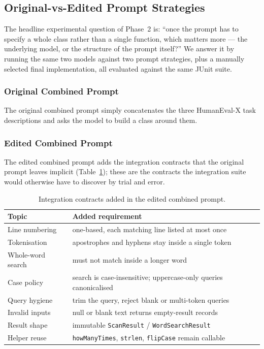 \documentclass[journal]{IEEEtran}
\begin{document}
\subsection{Original-vs-Edited Prompt Strategies}

The headline experimental question of Phase~2 is: ``once the prompt has
to specify a whole class rather than a single function, which matters
more --- the underlying model, or the structure of the prompt itself?'' We
answer it by running the same two models against two prompt strategies,
plus a manually selected final implementation, all evaluated against the
same JUnit suite.

\subsubsection{Original Combined Prompt}
The original combined prompt simply concatenates the three HumanEval-X
task descriptions and asks the model to build a class around them.

\subsubsection{Edited Combined Prompt}
The edited combined prompt adds the integration contracts that the
original prompt leaves implicit (Table~\ref{tab:prompt-edits}); these are
the contracts the integration suite would otherwise have to discover by
trial and error.

\begin{table}[!t]
\renewcommand{\arraystretch}{1.15}
\caption{Integration contracts added in the edited combined prompt.}
\label{tab:prompt-edits}
\centering
\footnotesize
\begin{tabular}{@{}p{2.6cm}p{4.6cm}@{}}
\toprule
\textbf{Topic} & \textbf{Added requirement} \\
\midrule
Line numbering    & one-based, each matching line listed at most once \\
Tokenisation      & apostrophes and hyphens stay inside a single token \\
Whole-word search & must not match inside a longer word \\
Case policy       & search is case-insensitive; uppercase-only queries canonicalised \\
Query hygiene     & trim the query, reject blank or multi-token queries \\
Invalid inputs    & null or blank text returns empty-result records \\
Result shape      & immutable \texttt{ScanResult} / \texttt{WordSearchResult} \\
Helper reuse      & \texttt{howManyTimes}, \texttt{strlen}, \texttt{flipCase} remain callable \\
\bottomrule
\end{tabular}
\end{table}
\end{document}
